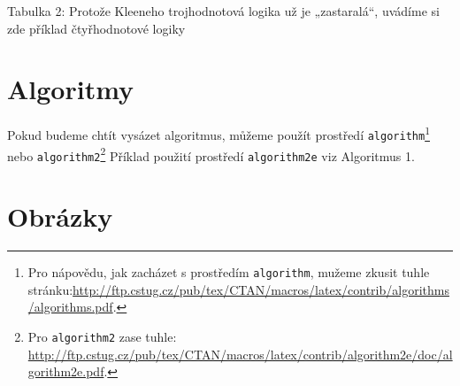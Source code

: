 \documentclass[11pt]{article}
\begin{document}
            Tabulka 2: Protože Kleeneho trojhodnotová logika už je „zastaralá“, uvádíme si zde příklad čtyřhodnotové logiky


    \section{Algoritmy}
        Pokud budeme chtít vysázet algoritmus, můžeme použít prostředí \verb|algorithm|\footnote[2]{Pro nápovědu, jak zacházet s prostředím \verb|algorithm|, mužeme zkusit tuhle stránku:\href{http://ftp.cstug.cz/pub/tex/CTAN/macros/latex/contrib/algorithms/algorithms.pdf}{http://ftp.cstug.cz/pub/tex/CTAN/macros/latex/contrib/algorithms/algorithms.pdf}.} nebo \verb|algorithm2|\footnote[3]{Pro \verb|algorithm2| zase tuhle: \href{http://ftp.cstug.cz/pub/tex/CTAN/macros/latex/contrib/algorithm2e/doc/algorithm2e.pdf}{http://ftp.cstug.cz/pub/tex/CTAN/macros/latex/contrib/algorithm2e/doc/algorithm2e.pdf}.} Příklad použití prostředí \verb|algorithm2e| viz Algoritmus 1.


    \section{Obrázky}
\end{document}
